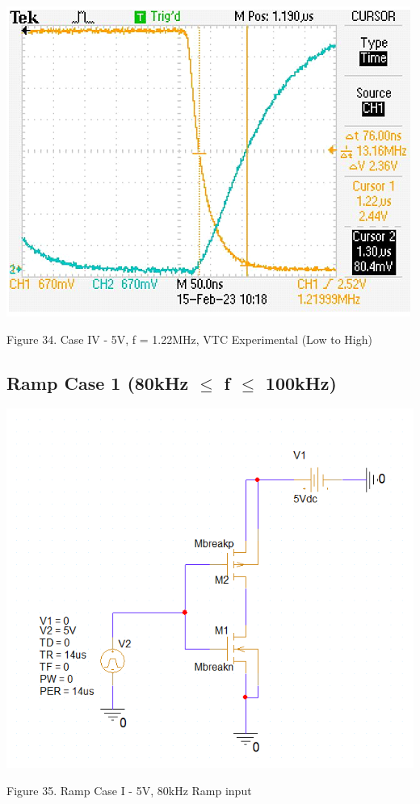 \documentclass[conference]{IEEEtran}
\begin{document}
\begin{center}
    \centerline{\includegraphics[scale = 0.6]{figures/case4_LH_experimental.png}}
    Figure 34. Case IV - 5V, f = 1.22MHz, VTC Experimental (Low to High)
\end{center}

\subsection{Ramp Case 1 (80kHz $\leq$ f $\leq$ 100kHz)}

\begin{center}
    \centerline{\includegraphics[scale = 0.51]{figures/rampcase1_circuit.png}}
    Figure 35. Ramp Case I - 5V, 80kHz Ramp input
\end{center}
\end{document}
